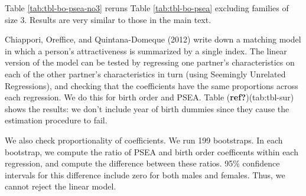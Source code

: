 \documentclass[
]{article}
\begin{document}
Table \ref{tab:tbl-bo-psea-no3} reruns Table \ref{tab:tbl-bo-psea}
excluding families of size 3. Results are very similar to those in the
main text.

Chiappori, Oreffice, and Quintana-Domeque (2012) write down a matching model in which a person's
attractiveness is summarized by a single index. The linear version of the
model can be tested by regressing one partner's characteristics on each of the
other partner's characteristics in turn (using Seemingly Unrelated
Regressions), and checking that the coefficients have the same proportions
across each regression. We do this for birth order and PSEA. Table
(\textbf{ref?})(tab:tbl-sur) shows the results: we don't include year of birth dummies
since they cause the estimation procedure to fail.

We also check proportionality of coefficients. We run 199 bootstraps.
In each bootstrap, we compute the ratio of PSEA and birth order coefficents
within each regression, and compute the difference between these ratios. 95\%
confidence intervals for this difference include zero for both males and
females. Thus, we cannot reject the linear model.

 
  \providecommand{\huxb}[2]{\arrayrulecolor[RGB]{#1}\global\arrayrulewidth=#2pt}
  \providecommand{\huxvb}[2]{\color[RGB]{#1}\vrule width #2pt}
  \providecommand{\huxtpad}[1]{\rule{0pt}{#1}}
  \providecommand{\huxbpad}[1]{\rule[-#1]{0pt}{#1}}
\end{document}
